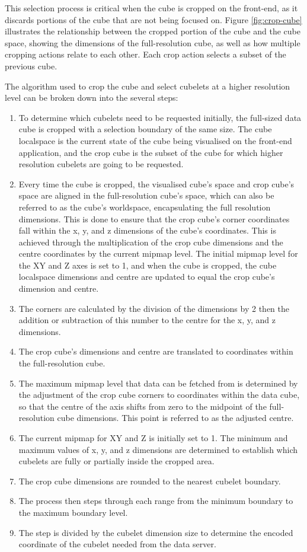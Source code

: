 This selection process is critical when the cube is cropped on the front-end, as it discards portions of the cube that are not being focused on. 
Figure \ref{fig:crop-cube} illustrates the relationship between the cropped portion of the cube and the cube space, showing the dimensions of the full-resolution cube, as well as how multiple cropping actions relate to each other. 
Each crop action selects a subset of the previous cube.

The algorithm used to crop the cube and select cubelets at a higher resolution level can be broken down into the several steps:
\begin{enumerate}
    \item To determine which cubelets need to be requested initially, the full-sized data cube is cropped with a selection boundary of the same size.  The cube localspace is the current state of the cube being visualised on the front-end application, and the crop cube is the subset of the cube for which higher resolution cubelets are going to be requested.
    \item Every time the cube is cropped, the visualised cube's space and crop cube's space are aligned in the full-resolution cube's space, which can also be referred to as the cube's worldspace, encapsulating the full resolution dimensions. This is done to ensure that the crop cube's corner coordinates fall within the x, y, and z dimensions of the cube's coordinates. This is achieved through the multiplication of the crop cube dimensions and the centre coordinates by the current mipmap level. The initial mipmap level for the XY and Z axes is set to 1, and when the cube is cropped, the cube localspace dimensions and centre are updated to equal the crop cube's dimension and centre.
    \item The corners are calculated by the division of the dimensions by 2 then the addition or subtraction of this number to the centre for the x, y, and z dimensions.
    \item The crop cube's dimensions and centre are translated to coordinates within the full-resolution cube.
    \item The maximum mipmap level that data can be fetched from is determined by the adjustment of the crop cube corners to coordinates within the data cube, so that the centre of the axis shifts from zero to the midpoint of the full-resolution cube dimensions. This point is referred to as the adjusted centre.
    \item The current mipmap for XY and Z is initially set to 1. The minimum and maximum values of x, y, and z dimensions are determined to establish which cubelets are fully or partially inside the cropped area.
    \item The crop cube dimensions are rounded to the nearest cubelet boundary. 
    \item The process then steps through each range from the minimum boundary to the maximum boundary level. 
    \item The step is divided by the cubelet dimension size to determine the encoded coordinate of the cubelet needed from the data server.
\end{enumerate}
